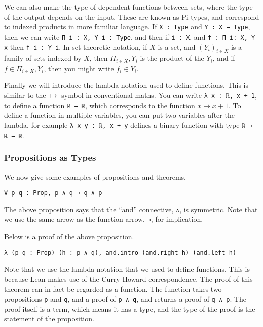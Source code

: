 \documentclass[12pt]{article} %
\theoremstyle{definition}
\theoremstyle{definition}
\theoremstyle{definition}
\theoremstyle{definition}
\theoremstyle{definition}
\theoremstyle{definition}
\begin{document}
We can also make the type of dependent functions between sets,
where the type of the output depends on the input. These are known as Pi types, and correspond
to indexed products in more familiar language.
If \lstinline{X : Type} and \lstinline{Y : X → Type}, then we can write
\lstinline{Π i : X, Y i : Type}, and then if \lstinline{i : X},
and \lstinline{f : Π i: X, Y x} then \lstinline{f i : Y i}.
In set theoretic notation, if $X$ is a set,
and $(Y_i)_{i \in X}$ is a family of sets indexed by $X$, then
$\Pi_{i \in X}, Y_i$ is the product of the $Y_i$, and if
$f \in \Pi_{i \in X}, Y_i$, then you might write $f_i \in Y_i$.

Finally we will introduce the lambda notation used to define functions. This
is similar to the $\mapsto$ symbol in conventional maths. You can write
\lstinline{λ x : ℝ, x + 1}, to define a function \lstinline{ℝ → ℝ},
which corresponds to the function $x \mapsto x + 1$. To define a function
in multiple variables, you can put two variables after the lambda, for example
\lstinline{λ x y : ℝ, x + y} defines a binary function with type \lstinline{ℝ → ℝ → ℝ}.

\subsubsection{Propositions as Types}

We now give some examples of propositions and theorems.

\begin{lstlisting}
∀ p q : Prop, p ∧ q → q ∧ p
\end{lstlisting}

The above proposition says that the ``and'' connective, \lstinline{∧}, is symmetric. Note that
we use the same arrow as the function arrow, \lstinline{→}, for implication.

Below is a proof of the above proposition.
\begin{lstlisting}
λ (p q : Prop) (h : p ∧ q), and.intro (and.right h) (and.left h)
\end{lstlisting}

Note that we use the lambda notation that we used to define functions. This is because Lean
makes use of the Curry-Howard correspondence. The proof of this theorem can in fact be
regarded as a function. The function takes two propositions \lstinline{p} and \lstinline{q},
and a proof of \lstinline{p ∧ q}, and returns a proof of \lstinline{q ∧ p}. The proof itself
is a term, which means it has a type, and the type of the proof is the statement of the proposition.
\end{document}
